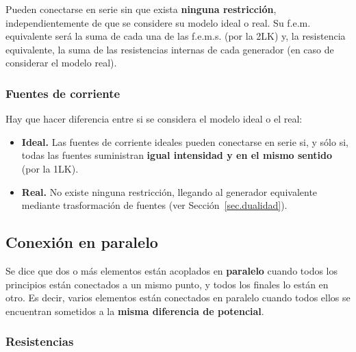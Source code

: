 		Pueden conectarse en serie sin que exista \textbf{ninguna restricción}, independientemente de que se considere su modelo ideal o real. Su f.e.m. equivalente será la suma de cada una de las f.e.m.s. (por la 2LK) y, la resistencia equivalente, la suma de las resistencias internas de cada generador (en caso de considerar el modelo real).
		
		\subsubsection{Fuentes de corriente} 
		
		Hay que hacer diferencia entre si se considera el modelo ideal o el real:
		\begin{itemize}
			\item \textbf{Ideal.} Las fuentes de corriente ideales pueden conectarse en serie si, y sólo si, todas las fuentes suministran \textbf{igual intensidad y en el mismo sentido} (por la 1LK).
			\item \textbf{Real.} No existe ninguna restricción, llegando al generador equivalente mediante trasformación de fuentes (ver Sección~\ref{sec.dualidad}). 
		\end{itemize}
	
	\subsection{Conexión en paralelo}
	Se dice que dos o más elementos están acoplados en \textbf{paralelo} cuando todos los principios están conectados a un mismo punto, y todos los finales lo están en otro. Es decir, varios elementos están conectados en paralelo cuando todos ellos se encuentran sometidos a la \textbf{misma diferencia de potencial}.
	
			\subsubsection{Resistencias} 
			

